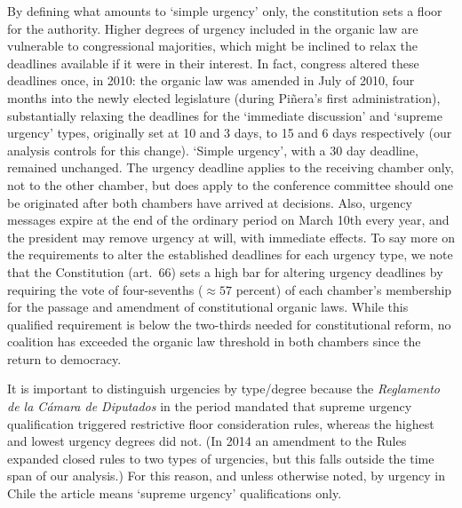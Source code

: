 \documentclass[letter,12pt]{article}
\begin{document}
\noindent By defining what amounts to `simple urgency' only, the constitution sets a floor for the authority. Higher degrees of urgency included in the organic law are vulnerable to congressional majorities, which might be inclined to relax the deadlines available if it were in their interest. In fact, congress altered these deadlines once, in 2010: the organic law was amended in July of 2010, four months into the newly elected legislature (during Piñera's first administration), substantially relaxing the deadlines for the `immediate discussion' and `supreme urgency' types, originally set at 10 and 3 days, to 15 and 6 days respectively (our analysis controls for this change). `Simple urgency', with a 30 day deadline, remained unchanged. The urgency deadline applies to the receiving chamber only, not to the other chamber, but does apply to the conference committee should one be originated after both chambers have arrived at decisions. Also, urgency messages expire at the end of the ordinary period on March 10th every year, and the president may remove urgency at will, with immediate effects. 
To say more on the requirements to alter the established deadlines for each urgency type, we note that the Constitution (art.~66) sets a high bar for altering urgency deadlines by requiring the vote of four-sevenths ($\approx 57$ percent) of each chamber's membership for the passage and amendment of constitutional organic laws. While this qualified requirement is below the two-thirds needed for constitutional reform, no coalition has exceeded the organic law threshold in both chambers since the return to democracy. 

It is important to distinguish urgencies by type/degree because the \emph{Reglamento de la Cámara de Diputados} in the period mandated that supreme urgency qualification triggered restrictive floor consideration rules, whereas the highest and lowest urgency degrees did not. (In 2014 an amendment to the Rules expanded closed rules to two types of urgencies, but this falls outside the time span of our analysis.) For this reason, and unless otherwise noted, by urgency in Chile the article means `supreme urgency' qualifications only. 
\end{document}

